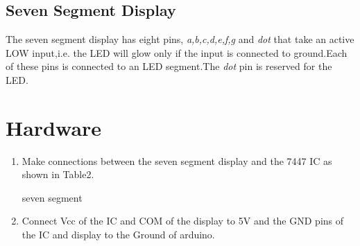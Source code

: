 \documentclass{article}
\begin{document}
\subsection{Seven Segment Display}
The seven segment display has eight pins, \emph{a,b,c,d,e,f,g} and \emph{dot} that take an active LOW input,i.e. the LED will glow only if the input is connected to ground.Each of these pins is connected to an LED segment.The \emph{dot} pin is reserved for the LED.
\section{Hardware}
\begin{enumerate}
\item Make connections between the seven segment display and the 7447 IC as shown in Table2.
\begin{table}[!h]                               
\centering                                     
                       
\caption{seven segment}                           
\label{table:Seven Segment}                        
\end{table}
\item Connect Vcc of the IC and COM of the display to 5V and the GND pins of the IC and display to the Ground of arduino.
\end{enumerate}
\end{document}
